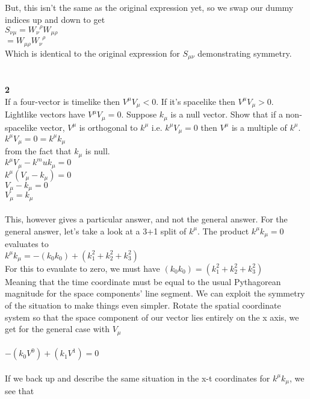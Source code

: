 \documentclass[prb,preprint]
{revtex4-1}
\newcommand{\PRLsep}{\noindent\makebox[\linewidth]{\resizebox{0.8888\linewidth}{2pt}{$\bullet$}}\bigskip}
\begin{document}
But, this isn't the same as the original expression yet, so we swap our dummy indices up and down to get 
\\
$S_{\nu\mu} = W_{\nu}^{\;\;\rho}W_{\mu\rho}$
\\
$= W_{\mu\rho} W_{\nu}^{\;\;\rho}$
\\
Which is identical to the original expression for $S_{\mu\nu}$ demonstrating symmetry.
\\
\PRLsep
\\
\\
\textbf{2}
\\
If a four-vector is timelike then $V^\mu V_\mu < 0$.  If it's spacelike then $V^\mu V_\mu > 0 $.  Lightlike vectors have $V^\mu V_\mu = 0$.  Suppose $k_\mu$ is a null vector.  Show that if a non-spacelike vector, $V^\mu$ is orthogonal to $k^\mu$ i.e. $k^\mu V_\mu = 0$ then $V^\mu$ is a multiple of $k^\mu$.
\\
$k^\mu V_\mu = 0 = k^\mu k_\mu$
\\
from the fact that $k_\mu$ is null.
\\
$k^\mu V_\mu - k^mu k_\mu = 0$
\\
$k^\mu\left(V_\mu - k_\mu\right) = 0$
\\
$V_\mu - k_\mu = 0$
\\
$V_\mu = k_\mu$
\\
\\
This, however gives a particular answer, and not the general answer.  For the general answer, let's take a look at a 3+1 split of $k^\mu$.  The product $k^\mu k_\mu = 0$ evaluates to 
\\
$k^\mu k_\mu = -\left(k_0 k_0\right) + \left(k_1^2 + k_2^2 + k_3^2\right)$
\\
For this to evaulate to zero, we must have 
$\left(k_0 k_0\right) = \left(k_1^2 + k_2^2 + k_3^2\right)$
\\
Meaning that the time coordinate must be equal to the usual Pythagorean magnitude for the space components' line segment.  We can exploit the symmetry of the situation to make things even simpler.  Rotate the spatial coordinate system so that the space component of our vector lies entirely on the x axis, we get for the general case with $V_\mu$
\\
\\
$-\left(k_0 V^0\right) + \left(k_1 V^1\right) = 0$
\\
\\
If we back up and describe the same situation in the x-t coordinates for $k^\mu k_\mu$, we see that 
\\
\end{document}
